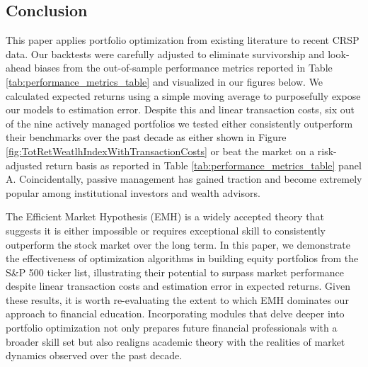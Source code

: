 \documentclass[12pt,letterpaper]{article}
\begin{document}
\clearpage

\subsection{Conclusion}

This paper applies portfolio optimization from existing literature to recent CRSP data. Our backtests were carefully adjusted to eliminate survivorship and look-ahead biases from the out-of-sample performance metrics reported in Table \ref{tab:performance_metrics_table} and visualized in our figures below. We calculated expected returns using a simple moving average to purposefully expose our models to estimation error. Despite this and linear transaction costs, six out of the nine actively managed portfolios we tested either consistently outperform their benchmarks over the past decade as either shown in Figure \ref{fig:TotRetWeatlhIndexWithTransactionCosts} or beat the market on a risk-adjusted return basis as reported in Table \ref{tab:performance_metrics_table} panel A. Coincidentally, passive management has gained traction and become extremely popular among institutional investors and wealth advisors.

The Efficient Market Hypothesis (EMH) is a widely accepted theory that suggests it is either impossible or requires exceptional skill to consistently outperform the stock market over the long term. In this paper, we demonstrate the effectiveness of optimization algorithms in building equity portfolios from the S\&P 500 ticker list, illustrating their potential to surpass market performance despite linear transaction costs and estimation error in expected returns. Given these results, it is worth re-evaluating the extent to which EMH dominates our approach to financial education. Incorporating modules that delve deeper into portfolio optimization not only prepares future financial professionals with a broader skill set but also realigns academic theory with the realities of market dynamics observed over the past decade.
    
\newpage


\end{document}
